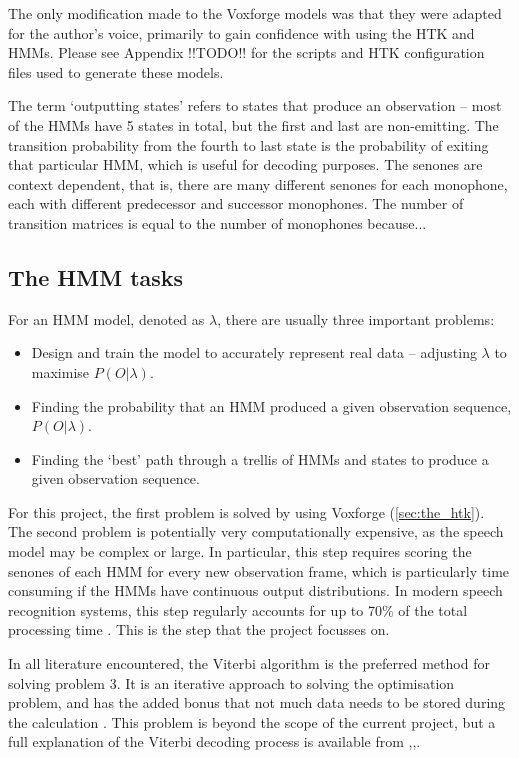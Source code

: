 	The only modification made to the Voxforge models was that they were adapted for the author's voice, primarily to gain confidence with using the HTK and HMMs.  Please see Appendix !!TODO!! for the scripts and HTK configuration files used to generate these models.

	The term `outputting states' refers to states that produce an observation -- most of the HMMs have 5 states in total, but the first and last are non-emitting.  The transition probability from the fourth to last state is the probability of exiting that particular HMM, which is useful for decoding purposes. The senones are context dependent, that is, there are many different senones for each monophone, each with different predecessor and successor monophones.  The number of transition matrices is equal to the number of monophones because...

	\subsection{The HMM tasks} %
	\label{sub:the_hmm_tasks}
		For an HMM model, denoted as $\lambda$, there are usually three important problems: 
		\begin{itemize}
			\item Design and train the model to accurately represent real data -- adjusting $\lambda$ to maximise $P(O | \lambda)$.
			\item Finding the probability that an HMM produced a given observation sequence, $P(O | \lambda)$.
			\item Finding the `best' path through a trellis of HMMs and states to produce a given observation sequence.
		\end{itemize}
		For this project, the first problem is solved by using Voxforge (\ref{sec:the_htk}).  The second problem is potentially very computationally expensive, as the speech model may be complex or large.  In particular, this step requires scoring the senones of each HMM for every new observation frame, which is particularly time consuming if the HMMs have continuous output distributions.  In modern speech recognition systems, this step regularly accounts for up to 70\% of the total processing time \cite{lai2002performance}.  This is the step that the project focusses on.

		In all literature encountered, the Viterbi algorithm is the preferred method for solving problem 3.  It is an iterative approach to solving the optimisation problem, and has the added bonus that not much data needs to be stored during the calculation \cite{schuster2006speech}.  This problem is beyond the scope of the current project, but a full explanation of the Viterbi decoding process is available from \cite{rabiner1989tutorial},\cite{melnikoff2003speech},\cite{saeed2008advanced}.

